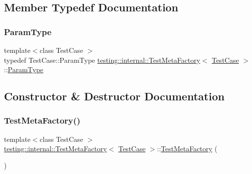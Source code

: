 \subsection{Member Typedef Documentation}
\mbox{\label{classtesting_1_1internal_1_1TestMetaFactory_a9c12e442b4389381b948ed669fcf0f84}} 
\subsubsection{\texorpdfstring{ParamType}{ParamType}}
{\footnotesize\ttfamily template$<$class Test\+Case $>$ \\
typedef Test\+Case\+::\+Param\+Type \mbox{\hyperlink{classtesting_1_1internal_1_1TestMetaFactory}{testing\+::internal\+::\+Test\+Meta\+Factory}}$<$ \mbox{\hyperlink{classtesting_1_1TestCase}{Test\+Case}} $>$\+::\mbox{\hyperlink{classtesting_1_1internal_1_1TestMetaFactory_a9c12e442b4389381b948ed669fcf0f84}{Param\+Type}}}



\subsection{Constructor \& Destructor Documentation}
\mbox{\label{classtesting_1_1internal_1_1TestMetaFactory_a3eadbf9867b702bcba130a3113a77b71}} 
\subsubsection{\texorpdfstring{TestMetaFactory()}{TestMetaFactory()}}
{\footnotesize\ttfamily template$<$class Test\+Case $>$ \\
\mbox{\hyperlink{classtesting_1_1internal_1_1TestMetaFactory}{testing\+::internal\+::\+Test\+Meta\+Factory}}$<$ \mbox{\hyperlink{classtesting_1_1TestCase}{Test\+Case}} $>$\+::\mbox{\hyperlink{classtesting_1_1internal_1_1TestMetaFactory}{Test\+Meta\+Factory}} (\begin{DoxyParamCaption}{ }\end{DoxyParamCaption})\hspace{0.3cm}{\ttfamily [inline]}}



